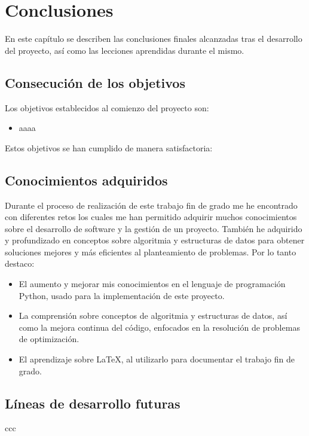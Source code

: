 
\chapter{Conclusiones} %

\label{Chapter6} %


En este capítulo se describen las conclusiones finales alcanzadas tras el desarrollo del proyecto, así como las lecciones aprendidas durante el mismo.

\section{Consecución de los objetivos}

Los objetivos establecidos al comienzo del proyecto son:

\begin{itemize}
  \item aaaa
\end{itemize}

Estos objetivos se han cumplido de manera satisfactoria:


\section{Conocimientos adquiridos}

Durante el proceso de realización de este trabajo fin de grado me he encontrado con diferentes retos los cuales me han permitido adquirir muchos conocimientos sobre el desarrollo de software y la gestión de un proyecto. También he adquirido y profundizado en conceptos sobre algoritmia y estructuras de datos para obtener soluciones mejores y más eficientes al planteamiento de problemas. Por lo tanto destaco:

\begin{itemize}
  \item El aumento y mejorar mis conocimientos en el lenguaje de programación Python, usado para la implementación de este proyecto.
  \item La comprensión sobre conceptos de algoritmia y estructuras de datos, así como la mejora continua del código, enfocados en la resolución de problemas de optimización.
  \item El aprendizaje sobre \LaTeX, al utilizarlo para documentar el trabajo fin de grado.
\end{itemize}

\section{Líneas de desarrollo futuras}
ccc
